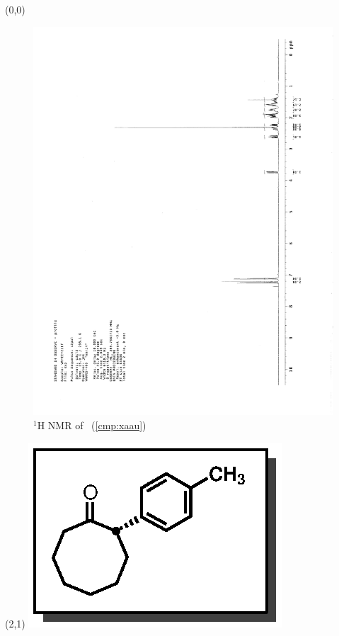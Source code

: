\begin{textblock}{20}(0,0)
\begin{figure}[htb]
\caption{$^1$H NMR of \CMPxaau\ (\ref{cmp:xaau})}
\includegraphics[scale=0.75, trim = 0mm 0mm 0mm 5mm,
clip]{chp_asymmetric/images/nmr/xaauH}
\vspace{-100pt}
\end{figure}
\end{textblock}
\begin{textblock}{1}(2,1)
\includegraphics[scale=0.8, angle=90]{chp_asymmetric/images/xaau}
\end{textblock}
